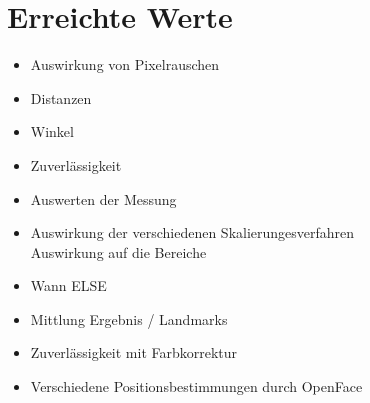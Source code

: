 \section{Erreichte Werte}
\begin{itemize}
	\item Auswirkung von Pixelrauschen
\item Distanzen
\item Winkel
\item Zuverlässigkeit
\item Auswerten der Messung
\item Auswirkung der verschiedenen Skalierungesverfahren\\
Auswirkung auf die Bereiche
\item Wann ELSE
\item Mittlung Ergebnis / Landmarks
\item Zuverlässigkeit mit Farbkorrektur
\item Verschiedene Positionsbestimmungen durch OpenFace
\end{itemize}